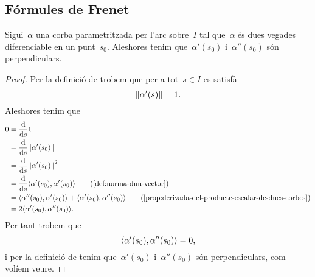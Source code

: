 \documentclass[../geometria-diferencial.tex]{subfiles}
\begin{document}
    \subsection{Fórmules de Frenet}
    \begin{proposition}
        \label{prop:la-primera-derivada-i-la-segona-derivada-duna-corba-son-perpendiculars}
        Sigui~\(\alpha\) una corba parametritzada per l'arc sobre~\(I\) tal que~\(\alpha\) és dues vegades diferenciable en un punt~\(s_{0}\).
        Aleshores tenim que~\(\alpha'(s_{0})\) i~\(\alpha''(s_{0})\) són perpendiculars.
    \begin{proof}
        Per la definició de  trobem que per a tot~\(s\in I\) es satisfà
        \[
            \norm{\alpha'(s)}=1.
        \]
        Aleshores tenim que
        \begin{align*}
            0&=\frac{\diff}{\diff s}1 \\
            &=\frac{\diff}{\diff s}\norm{\alpha'(s_{0})} \\
            &=\frac{\diff}{\diff s}\norm{\alpha'(s_{0})}^{2} \\
            &=\frac{\diff}{\diff s}\prodesc{\alpha'(s_{0})}{\alpha'(s_{0})} \tag{\ref{def:norma-dun-vector}} \\
            &=\prodesc{\alpha''(s_{0})}{\alpha'(s_{0})}+\prodesc{\alpha'(s_{0})}{\alpha''(s_{0})} \tag{\ref{prop:derivada-del-producte-escalar-de-dues-corbes}} \\
            &=2\prodesc{\alpha'(s_{0})}{\alpha''(s_{0})}.
        \end{align*}
        Per tant trobem que
        \[
            \prodesc{\alpha'(s_{0})}{\alpha''(s_{0})}=0,
        \]
        i per la definició de  tenim que~\(\alpha'(s_{0})\) i~\(\alpha''(s_{0})\) són perpendiculars, com volíem veure.
    \end{proof}
    \end{proposition}
\end{document}
